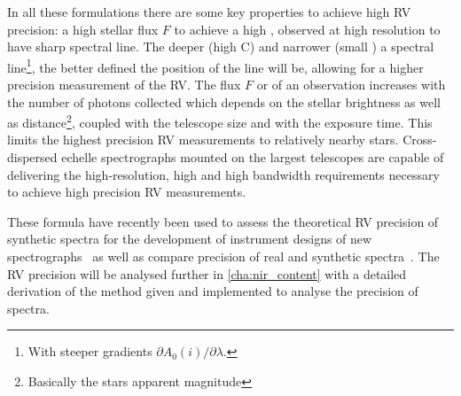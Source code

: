 In all these formulations there are some key properties to achieve high RV precision: a high stellar flux $F$ to achieve a high \snr{}, observed at high resolution to have sharp spectral line.
The deeper (high C) and narrower (small \fwhm{}) a spectral line\footnote{With steeper gradients $\partial A_0(i)/\partial\lambda$.}, the better defined the position of the line will be, allowing for a higher precision measurement of the RV.
The flux $F$ or \snr{} of an observation increases with the number of photons collected which depends on the stellar brightness as well as distance\footnote{Basically the stars apparent magnitude}, coupled with the telescope size and with the exposure time.
This limits the highest precision RV measurements to relatively nearby stars.
Cross-dispersed echelle spectrographs mounted on the largest telescopes are capable of delivering the high-resolution, high \snr{} and high bandwidth requirements necessary to achieve high precision RV measurements.

These formula have recently been used to assess the theoretical RV precision of synthetic spectra for the development of instrument designs of new \nir{} spectrographs~\citep[e.g.][]{figueira_radial_2016} as well as compare precision of real and synthetic spectra~\citep[e.g.][]{artigau_optical_2018}.
The RV precision will be analysed further in \cref{cha:nir_content} with a detailed derivation of the \citet{bouchy_fundamental_2001} method given and implemented to analyse the precision of \nir{} spectra.
